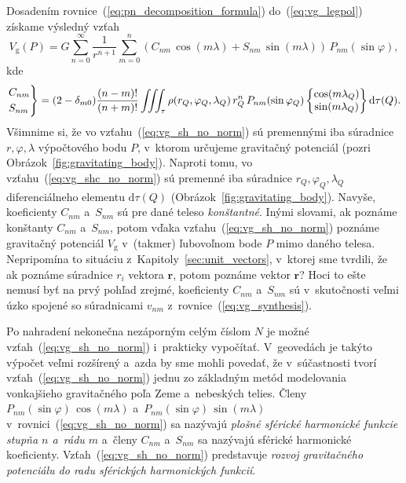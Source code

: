 \documentclass[a4paper, 12pt]{book}
\newcommand{\diff}{\mathrm d}
\newcommand{\gidx}{\mathrm g}
\let\vec\mathbf
\begin{document}
Dosadením rovnice~(\ref{eq:pn_decomposition_formula}) do~(\ref{eq:vg_legpol}) 
získame výsledný vzťah
%
\begin{equation}
\label{eq:vg_sh_no_norm}
V_\gidx(P) = G \sum_{n = 0}^\infty \frac{1}{r^{n + 1}} \sum_{m = 0}^{n} \left( 
C_{nm} \, \cos(m\lambda) + S_{nm} \, \sin(m\lambda)\right) \, 
P_{nm}(\sin\varphi){,}
\end{equation}
%
kde
%
\begin{equation}
\label{eq:vg_shc_no_norm}
\begin{rcases}
C_{nm}\\
S_{nm}
\end{rcases}
= (2 - \delta_{m0}) \frac{(n - m)!}{(n + m)!} \iiint_{\tau} \rho(r_Q, 
\varphi_Q, \lambda_Q) \, r_Q^n \, P_{nm}(\sin\varphi_Q)
%
\begin{Bmatrix}
\cos(m\lambda_Q)\\
\sin(m\lambda_Q)
\end{Bmatrix}
%
\diff\tau(Q){.}
\end{equation}
%
Všimnime si, že vo vzťahu~(\ref{eq:vg_sh_no_norm}) sú premennými iba súradnice 
$r, \varphi, \lambda$ výpočtového bodu $P$, v~ktorom určujeme gravitačný 
potenciál (pozri Obrázok~\ref{fig:gravitating_body}).  Naproti tomu, vo 
vzťahu~(\ref{eq:vg_shc_no_norm}) sú premenné iba súradnice $r_Q,\varphi_Q, 
\lambda_Q$ diferenciálneho elementu $\diff\tau(Q)$ 
(Obrázok~\ref{fig:gravitating_body}).  Navyše, koeficienty $C_{nm}$ a~$S_{nm}$ 
sú pre dané teleso \emph{konštantné}.  Inými slovami, ak poznáme konštanty 
$C_{nm}$ a~$S_{nm}$, potom vďaka vzťahu~(\ref{eq:vg_sh_no_norm}) poznáme 
gravitačný potenciál $V_\gidx$ v~(takmer) ľubovoľnom bode $P$ mimo daného 
telesa.  Nepripomína to situáciu z~Kapitoly~\ref{sec:unit_vectors}, v~ktorej 
sme tvrdili, že ak poznáme súradnice $r_i$ vektora $\vec r$, potom poznáme 
vektor $\vec r$?  Hoci to ešte nemusí byť na prvý pohľad zrejmé, koeficienty 
$C_{nm}$ a~$S_{nm}$ sú v~skutočnosti veľmi úzko spojené so súradnicami $v_{nm}$ 
z~rovnice~(\ref{eq:vg_synthesis}).

Po nahradení nekonečna nezáporným celým číslom $N$ je možné 
vzťah~(\ref{eq:vg_sh_no_norm}) i~prakticky vypočítať.  V~geovedách je takýto 
výpočet veľmi rozšírený a~azda by sme mohli povedať, že v~súčastnosti tvorí 
vzťah~(\ref{eq:vg_sh_no_norm}) jednu zo základným metód modelovania vonkajšieho 
gravitačného poľa Zeme a~nebeských telies.  Členy $P_{nm}(\sin\varphi) \, 
\cos(m\lambda)$ a~$ P_{nm}(\sin\varphi) \, \sin(m\lambda)$ 
v~rovnici~(\ref{eq:vg_sh_no_norm}) sa nazývajú \emph{plošné sférické harmonické 
funkcie stupňa $n$ a~rádu $m$} a~členy $C_{nm}$ a~$S_{nm}$ sa nazývajú sférické 
harmonické koeficienty.  Vzťah~(\ref{eq:vg_sh_no_norm}) predstavuje 
\emph{rozvoj gravitačného potenciálu do radu sférických harmonických funkcií}.
\end{document}

